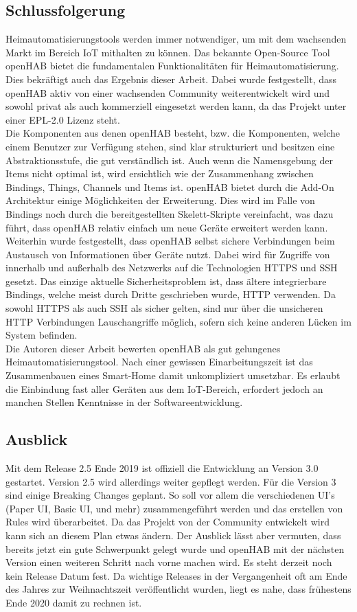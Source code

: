 \subsection{Schlussfolgerung}
Heimautomatisierungstools werden immer notwendiger, um mit dem wachsenden Markt im Bereich IoT mithalten zu können.\cite{STATISTA01:IOT} Das bekannte Open-Source Tool openHAB bietet die fundamentalen Funktionalitäten für Heimautomatisierung. Dies bekräftigt auch das Ergebnis dieser Arbeit. Dabei wurde festgestellt, dass openHAB aktiv von einer wachsenden Community weiterentwickelt wird und sowohl privat als auch kommerziell eingesetzt werden kann, da das Projekt unter einer EPL-2.0 Lizenz steht.\\
Die Komponenten aus denen openHAB besteht, bzw. die Komponenten, welche einem Benutzer zur Verfügung stehen, sind klar strukturiert und besitzen eine Abstraktionsstufe, die gut verständlich ist. Auch wenn die Namensgebung der Items nicht optimal ist, wird ersichtlich wie der Zusammenhang zwischen Bindings, Things, Channels und Items ist. openHAB bietet durch die Add-On Architektur einige Möglichkeiten der Erweiterung. Dies wird im Falle von Bindings noch durch die bereitgestellten Skelett-Skripte vereinfacht, was dazu führt, dass openHAB relativ einfach um neue Geräte erweitert werden kann.\\
Weiterhin wurde festgestellt, dass openHAB selbst sichere Verbindungen beim Austausch von Informationen über Geräte nutzt. Dabei wird für Zugriffe von innerhalb und außerhalb des Netzwerks auf die Technologien HTTPS und SSH gesetzt. Das einzige aktuelle Sicherheitsproblem ist, dass ältere integrierbare Bindings, welche meist durch Dritte geschrieben wurde, HTTP verwenden. Da sowohl HTTPS als auch SSH als sicher gelten, sind nur über die unsicheren HTTP Verbindungen Lauschangriffe möglich, sofern sich keine anderen Lücken im System befinden.
\\
Die Autoren dieser Arbeit bewerten openHAB als gut gelungenes Heimautomatisierungstool. Nach einer gewissen Einarbeitungszeit ist das Zusammenbauen eines Smart-Home damit unkompliziert umsetzbar. Es erlaubt die Einbindung fast aller Geräten aus dem IoT-Bereich, erfordert jedoch an manchen Stellen Kenntnisse in der Softwareentwicklung.


\subsection{Ausblick}
Mit dem Release 2.5 Ende 2019 ist offiziell die Entwicklung an Version 3.0 gestartet. Version 2.5 wird allerdings weiter gepflegt werden. Für die Version 3 sind einige Breaking Changes geplant. So soll vor allem die verschiedenen UI's (Paper UI, Basic UI, und mehr) zusammengeführt werden und das erstellen von Rules wird überarbeitet.\cite{openHAB02:OH} Da das Projekt von der Community entwickelt wird kann sich an diesem Plan etwas ändern. Der Ausblick lässt aber vermuten, dass bereits jetzt ein gute Schwerpunkt gelegt wurde und openHAB mit der nächsten Version einen weiteren Schritt nach vorne machen wird. Es steht derzeit noch kein Release Datum fest. Da wichtige Releases in der Vergangenheit oft am Ende des Jahres zur Weihnachtszeit veröffentlicht wurden, liegt es nahe, dass frühestens Ende 2020 damit zu rechnen ist.

